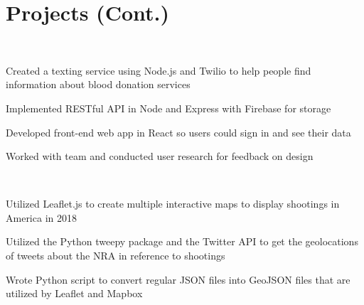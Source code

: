\documentclass[]{deedy-resume-openfont}
\begin{document}
\begin{minipage}[t]{0.60\textwidth}
\section{Projects (Cont.)}
 \\
\vspace{\topsep}
\begin{tightemize}
\item Created a texting service using Node.js and Twilio to help people find information about blood donation services
\item Implemented RESTful API in Node and Express with Firebase for storage
\item Developed front-end web app in React so users could sign in and see their data
\item Worked with team and conducted user research for feedback on design
\end{tightemize}
\sectionsep

 \\
\vspace{\topsep}
\begin{tightemize}
\item Utilized Leaflet.js to create multiple interactive maps to display shootings in America in 2018
\item Utilized the Python tweepy package and the Twitter API to get the geolocations of tweets about the NRA in reference to shootings
\item Wrote Python script to convert regular JSON files into GeoJSON files that are utilized by Leaflet and Mapbox 
\end{tightemize}
\sectionsep



\end{minipage} 
\end{document}
